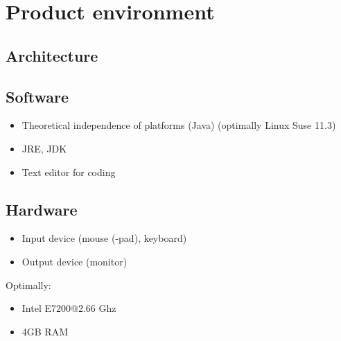 \section{Product environment}

\subsection{Architecture}

\subsection{Software}
\begin{itemize}
\item Theoretical independence of platforms (Java) (optimally Linux Suse 11.3)
\item JRE, JDK
\item Text editor for coding
\end{itemize}

\subsection{Hardware}
\begin{itemize}
\item Input device (mouse (-pad), keyboard)
\item Output device (monitor)
\end{itemize}
Optimally:
\begin{itemize}
\item Intel E7200@2.66 Ghz
\item 4GB RAM
\end{itemize}